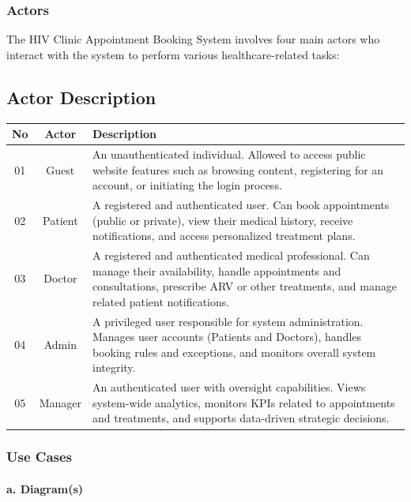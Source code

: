 \documentclass[12pt,a4paper]{article}
\begin{document}
\subsubsection{Actors}

The HIV Clinic Appointment Booking System involves four main actors who interact with the system to perform various healthcare-related tasks:

\subsection{Actor Description}

\begin{longtable}{|c||c|p{9cm}|}
\hline
\textbf{No} & \textbf{Actor} & \textbf{Description} \\
\hline
01 & Guest & An unauthenticated individual. Allowed to access public website features such as browsing content, registering for an account, or initiating the login process. \\
\hline
02 & Patient & A registered and authenticated user. Can book appointments (public or private), view their medical history, receive notifications, and access personalized treatment plans. \\
\hline
03 & Doctor & A registered and authenticated medical professional. Can manage their availability, handle appointments and consultations, prescribe ARV or other treatments, and manage related patient notifications. \\
\hline
04 & Admin & A privileged user responsible for system administration. Manages user accounts (Patients and Doctors), handles booking rules and exceptions, and monitors overall system integrity. \\
\hline
05 & Manager & An authenticated user with oversight capabilities. Views system-wide analytics, monitors KPIs related to appointments and treatments, and supports data-driven strategic decisions. \\
\hline
\end{longtable}


\subsubsection{Use Cases}

\paragraph{a. Diagram(s)}
\end{document}
